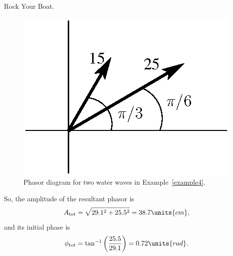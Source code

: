 \begin{example}{Rock Your Boat.}
\begin{solution}
\begin{figure}\begin{center}
 \includegraphics[width=2.0truein]{phasors/phasor10} 
\caption{\label{fig:phasor10}Phasor diagram for 
two water waves in Example~\ref{example4}. }
\end{center}
\end{figure}

\noindent So, the amplitude of the resultant phasor is 
\begin{equation}
A_{\rm tot} = \sqrt{29.1^2 + 25.5^2} =38.7\units{cm}, 
\end{equation} 
and its initial phase is 
\begin{equation}
\phi_{\rm tot} = \tan^{-1}{\left(\frac{25.5}{29.1}\right)} 
                  = 0.72\units{rad}.  
\end{equation} 


\end{solution}
\end{example}
